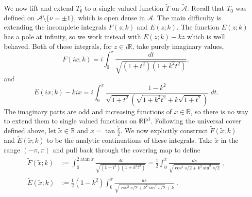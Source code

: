 \documentclass{article}
\numberwithin{equation}{section}
\numberwithin{figure}{section}
\newcommand{\bra}[1]{\left(#1\right)}
\DeclareMathOperator{\atan}{atan}
\newcommand{\iu}{i}
\newcommand{\R}{\mathbb{R}}
\newcommand{\RP}{\mathbb{R}\text{P}}
\begin{document}
We now lift and extend $T_0$ to a single valued function $\tilde{T}$ on $\mathcal{\tilde{A}}$. Recall that $T_0$ was defined on $\mathcal{A}\setminus\{\nu = \pm 1\}$, which is open dense in $\mathcal{A}$. The main difficulty is extending the incomplete integrals $F(z;k)$ and $E(z;k)$. The function $E(z;k)$ has a pole at infinity, so we work instead with $E(z;k) - kz$ which is well behaved. Both of these integrals, for $z\in \iu\R$, take purely imaginary values,
\[
F(\iu x; k)
= \iu \int_0^x \frac{dt}{\sqrt{(1+t^2)(1+k^2 t^2)}},
\]
and
\[
E(\iu x; k) - k\iu x
= \iu \int_0^x \frac{1-k^2}{\sqrt{1+t^2}\left( \sqrt{1+k^2t^2} + k\sqrt{1+t^2} \right)} \;dt.
\]
The imaginary parts are odd and increasing functions of $x\in\R$, so there is no way to extend them to single valued functions on $\RP^1$. Following the universal cover defined above, let $\tilde{x}\in\R$ and $x = \tan\frac{\tilde{x}}{2}$. We now explicitly construct $\tilde{F}(\tilde{x};k)$ and $\tilde{E}(\tilde{x};k)$ to be the analytic continuations of these integrals. Take $\tilde{x}$ in the range $(-\pi,\pi)$ and pull back through the covering map to define
\begin{align*}
\tilde{F}(\tilde{x};k)
&:= \int_0^{2 \atan \tilde{x}} \frac{dt}{\sqrt{(1+t^2)(1+k^2t^2)}}
= \frac{1}{2} \int_0^{\tilde{x}} \frac{ds}{\sqrt{\cos^2 s/2 + k^2 \sin^2 s/2}} \;, \\
\tilde{E}(\tilde{x}; k)
&:= \frac{1}{2} (1-k^2) \int_0^{\tilde{x}} \frac{ds}{\sqrt{\cos^2 s/2 + k^2\sin^2 s/2} + k}\;.
\end{align*}
\end{document}
